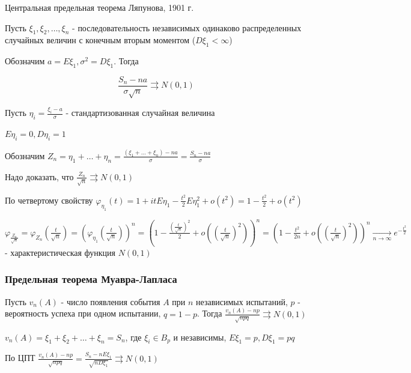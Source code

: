 \documentclass[12pt]{article}
\begin{document}
\begin{MyTheorem}
    \Ths Центральная предельная теорема Ляпунова, 1901 г.

    Пусть $\xi_1, \xi_2, \dots, \xi_n$ - последовательность независимых одинаково распределенных случайных величин с конечным вторым моментом ($D\xi_1 < \infty$)

    Обозначим $a = E\xi_1, \sigma^2 = D\xi_1$. Тогда 

    \[\frac{S_n - na}{\sigma\sqrt{n}} \rightrightarrows N(0, 1)\]
\end{MyTheorem}

\begin{MyProof}
    Пусть $\eta_i = \frac{\xi_i - a}{\sigma}$ - стандартизованная случайная величина

    $E\eta_i = 0, D\eta_i = 1$

    Обозначим $Z_n = \eta_1 + \dots + \eta_n = \frac{(\xi_1 + \dots + \xi_n) - na}{\sigma} = \frac{S_n - na}{\sigma}$

    Надо доказать, что $\frac{Z_n}{\sqrt{n}} \rightrightarrows N(0, 1)$

    По четвертому свойству $\varphi_{\eta_1}(t) = 1 + itE\eta_1 - \frac{t^2}{2} E\eta_1^2 + o(t^2) = 1 - \frac{t^2}{2} + o(t^2)$

    $\varphi_{\frac{Z_n}{\sqrt{n}}} = \varphi_{Z_n}\left(\frac{t}{\sqrt{n}}\right) = \left(\varphi_{\eta_1}\left(\frac{t}{\sqrt{n}}\right)\right)^n = 
    \left(1 - \frac{\left(\frac{t}{\sqrt{n}}\right)^2}{2} + o\left(\left(\frac{t}{\sqrt{n}}\right)^2\right)\right)^n =
    \left(1 - \frac{t^2}{2n} + o\left(\left(\frac{t}{\sqrt{n}}\right)^2\right)\right)^n \underset{n \to \infty}{\longrightarrow} e^{-\frac{t^2}{2}}$ - 
    характеристическая функция $N(0, 1)$
\end{MyProof}

\hypertarget{limittheoremdemoivrelaplace}{}

\subsubsection{Предельная теорема Муавра-Лапласа}

\begin{MyTheorem}
    \Ths Пусть $v_n(A)$ - число появления события $A$ при $n$ независимых испытаний, $p$ - вероятность успеха при одном испытании, $q = 1 - p$.
    Тогда $\frac{v_n(A) - np}{\sqrt{npq}} \rightrightarrows N(0, 1)$
\end{MyTheorem}

\begin{MyProof}
    $v_n(A) = \xi_1 + \xi_2 + \dots + \xi_n = S_n$, где $\xi_i \in B_p$ и независимы, $E\xi_1 = p, D\xi_1 = pq$

    По ЦПТ $\frac{v_n(A) - np}{\sqrt{npq}} = \frac{S_n - nE\xi_1}{\sqrt{nD\xi_1}} \rightrightarrows N(0, 1)$
\end{MyProof}
\end{document}
